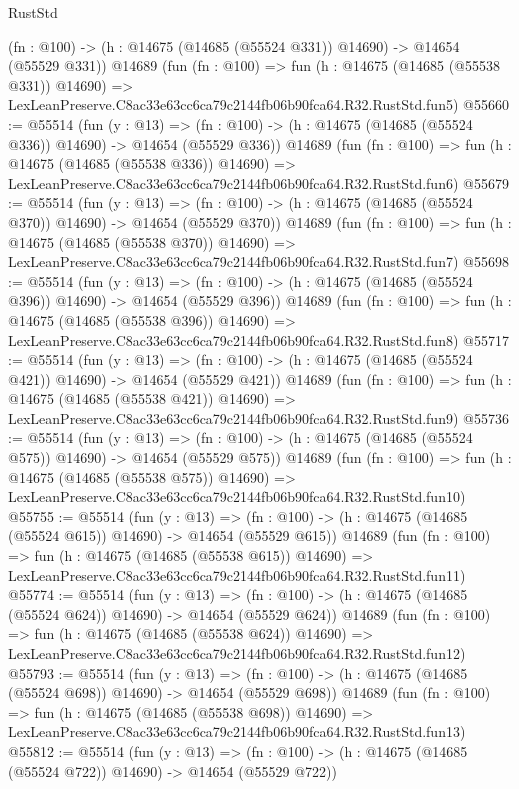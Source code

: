 \begin{lexlean}{RustStd}
\begin{coremodule}
    (fn : @100) -> (h : @14675 (@14685 (@55524 @331)) @14690) -> @14654 (@55529 @331))
    @14689
    (fun (fn : @100) =>
    fun (h : @14675 (@14685 (@55538 @331)) @14690) =>
    LexLeanPreserve.C8ac33e63cc6ca79c2144fb06b90fca64.R32.RustStd.fun5)
@55660 := @55514
    (fun (y : @13) =>
    (fn : @100) -> (h : @14675 (@14685 (@55524 @336)) @14690) -> @14654 (@55529 @336))
    @14689
    (fun (fn : @100) =>
    fun (h : @14675 (@14685 (@55538 @336)) @14690) =>
    LexLeanPreserve.C8ac33e63cc6ca79c2144fb06b90fca64.R32.RustStd.fun6)
@55679 := @55514
    (fun (y : @13) =>
    (fn : @100) -> (h : @14675 (@14685 (@55524 @370)) @14690) -> @14654 (@55529 @370))
    @14689
    (fun (fn : @100) =>
    fun (h : @14675 (@14685 (@55538 @370)) @14690) =>
    LexLeanPreserve.C8ac33e63cc6ca79c2144fb06b90fca64.R32.RustStd.fun7)
@55698 := @55514
    (fun (y : @13) =>
    (fn : @100) -> (h : @14675 (@14685 (@55524 @396)) @14690) -> @14654 (@55529 @396))
    @14689
    (fun (fn : @100) =>
    fun (h : @14675 (@14685 (@55538 @396)) @14690) =>
    LexLeanPreserve.C8ac33e63cc6ca79c2144fb06b90fca64.R32.RustStd.fun8)
@55717 := @55514
    (fun (y : @13) =>
    (fn : @100) -> (h : @14675 (@14685 (@55524 @421)) @14690) -> @14654 (@55529 @421))
    @14689
    (fun (fn : @100) =>
    fun (h : @14675 (@14685 (@55538 @421)) @14690) =>
    LexLeanPreserve.C8ac33e63cc6ca79c2144fb06b90fca64.R32.RustStd.fun9)
@55736 := @55514
    (fun (y : @13) =>
    (fn : @100) -> (h : @14675 (@14685 (@55524 @575)) @14690) -> @14654 (@55529 @575))
    @14689
    (fun (fn : @100) =>
    fun (h : @14675 (@14685 (@55538 @575)) @14690) =>
    LexLeanPreserve.C8ac33e63cc6ca79c2144fb06b90fca64.R32.RustStd.fun10)
@55755 := @55514
    (fun (y : @13) =>
    (fn : @100) -> (h : @14675 (@14685 (@55524 @615)) @14690) -> @14654 (@55529 @615))
    @14689
    (fun (fn : @100) =>
    fun (h : @14675 (@14685 (@55538 @615)) @14690) =>
    LexLeanPreserve.C8ac33e63cc6ca79c2144fb06b90fca64.R32.RustStd.fun11)
@55774 := @55514
    (fun (y : @13) =>
    (fn : @100) -> (h : @14675 (@14685 (@55524 @624)) @14690) -> @14654 (@55529 @624))
    @14689
    (fun (fn : @100) =>
    fun (h : @14675 (@14685 (@55538 @624)) @14690) =>
    LexLeanPreserve.C8ac33e63cc6ca79c2144fb06b90fca64.R32.RustStd.fun12)
@55793 := @55514
    (fun (y : @13) =>
    (fn : @100) -> (h : @14675 (@14685 (@55524 @698)) @14690) -> @14654 (@55529 @698))
    @14689
    (fun (fn : @100) =>
    fun (h : @14675 (@14685 (@55538 @698)) @14690) =>
    LexLeanPreserve.C8ac33e63cc6ca79c2144fb06b90fca64.R32.RustStd.fun13)
@55812 := @55514
    (fun (y : @13) =>
    (fn : @100) -> (h : @14675 (@14685 (@55524 @722)) @14690) -> @14654 (@55529 @722))

\end{coremodule}
\end{lexlean}
